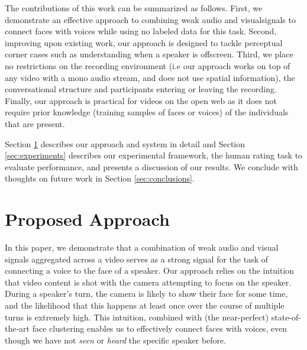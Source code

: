 \documentclass[a4paper]{article}
\begin{document}
The contributions of this work can be summarized as follows. First, we demonstrate an effective approach to combining weak audio and visual\footnotemark signals to connect faces with voices while using no labeled data for this task. Second, improving upon existing work, our approach is designed to tackle perceptual corner cases such as understanding when a speaker is offscreen. Third, we place no restrictions on the recording environment (i.e our approach works on top of any video with a mono audio stream, and does not use spatial information), the conversational structure and participants entering or leaving the recording. Finally, our approach is practical for videos on the open web as it does not require prior knowledge (training samples of faces or voices) of the individuals that are present. 

Section \ref{sec:approach} describes our approach and system in detail and Section \ref{sec:experiments} describes our experimental framework, the human rating task to evaluate performance, and presents a discussion of our results. We conclude with thoughts on future work in Section \ref{sec:conclusions}.

\section{Proposed Approach}
\label{sec:approach}

In this paper, we demonstrate that a combination of weak audio and visual signals aggregated across a video serves as a strong signal for the task of connecting a voice to the face of a speaker. 
Our approach relies on the intuition that video content is shot with the camera attempting to focus on the speaker. During a speaker's turn, the camera is likely to show their face for some time, and the likelihood that this happens at least once over the course of multiple turns is extremely high. This intuition, combined with (the near-perfect) state-of-the-art face clustering enables us to effectively connect faces with voices, even though we have not {\it seen} or {\it heard} the specific speaker before. 
\end{document}
